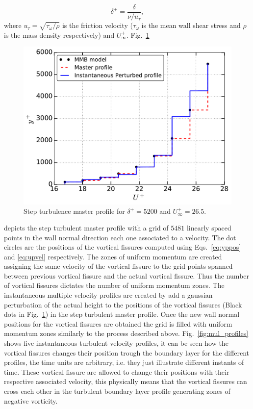 \documentclass[aps,reprint,amsmath,amssymb,prl]{revtex4-1}%
\begin{document}
\begin{equation}\label{eq:deltap}
\delta^+=\frac{\delta}{\nu/u_{\tau}},
\end{equation}
where $u_{\tau}=\sqrt{\tau_{\omega}/\rho}$ is the friction velocity ($\tau_{\omega}$ is the mean wall shear stress and $\rho$ is the mass density respectively) and $U^+_{\infty}$. 
Fig.~\ref{fig:master_profile} 
\begin{figure}[b]
\includegraphics[scale=0.46]{figures/Master_step_profile}
\caption{\label{fig:master_profile} Step turbulence master profile for $\delta^+=5200$ and $U^+_{\infty}=26.5$.}
\end{figure} 
depicts the step turbulent master profile with a grid of $5481$ linearly spaced points in the wall normal direction each one associated to a velocity. The dot circles are the positions of the vortical fissures computed using Eqs.~\ref{eq:yppos} and \ref{eq:upvel} respectively. The zones of uniform momentum are created assigning the same velocity of the vortical fissure to the grid points spanned between previous vortical fissure and the actual vortical fissure. Thus the number of vortical fissures dictates the number of uniform momentum zones. The instantaneous multiple velocity profiles are created by add a gaussian perturbation of the actual height to the positions of the vortical fissures (Black dots in Fig.~\ref{fig:master_profile}) in the step turbulent master profile. Once the new wall normal positions for the vortical fissures are obtained the grid is filled with uniform momentum zones similarly to the process described above. Fig.~\ref{fig:mul_profiles} shows five instantaneous turbulent velocity profiles, it can be seen how the vortical fissures changes their position trough the boundary layer for the different profiles, the time units are arbitrary, i.e. they just illustrate different instants of time. These vortical fissure are allowed to change their positions with their respective associated velocity, this physically means that the vortical fissures can cross each other in the turbulent boundary layer  profile generating zones of negative vorticity.
\end{document}
